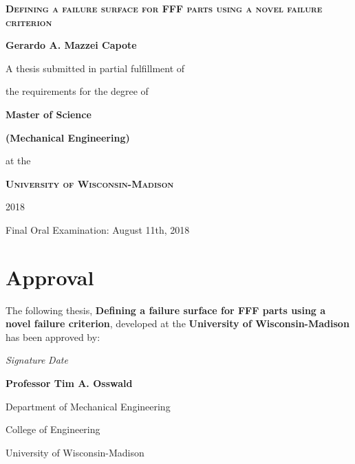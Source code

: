 \documentclass[main.tex]{subfiles}
\begin{document}
\begin{titlepage}
	\begin{center}
		\vspace{1cm}
		{\scshape\Huge\textbf{Defining a failure surface for FFF parts using a novel failure criterion} \par}
		\vspace{1cm}
		{\LARGE\textbf{Gerardo A. Mazzei Capote} \par}
		\vspace{1cm}
		{\Large A thesis submitted in partial fulfillment of \par 
				the requirements for the degree of \par}
		\vspace{1cm}
		{\LARGE\textbf{Master of Science} \par}
		{\LARGE\textbf{(Mechanical Engineering)} \par}
		\vspace{1cm}
		{\Large at the \par}
		\vspace{0.5cm}
		{\scshape\LARGE\textbf{ University of Wisconsin-Madison} \par}
		\vspace{0.5cm}
		{\Large 2018 \par}
		\vfill
		{\large Final Oral Examination: August 11th, 2018}		%
	\end{center}
\end{titlepage}

\pagestyle{empty}
\cleardoublepage
\setcounter{page}{1}

\chapter*{Approval}
The following thesis, \textbf{Defining a failure surface for FFF parts using a novel failure criterion}, developed at the \textbf{University of Wisconsin-Madison}
has been approved by:
\vspace{2cm}

\noindent
\makebox[7cm]{\hrulefill} \hfill\makebox[4cm]{\hrulefill}
\par\noindent
\textit{Signature} \hfill\textit{Date}\hspace{3cm}
\vspace{5 mm}
\par\noindent
\textbf{Professor Tim A. Osswald}
\par\noindent Department of Mechanical Engineering
\par\noindent College of Engineering
\par\noindent University of Wisconsin-Madison

\cleardoublepage
\end{document}
